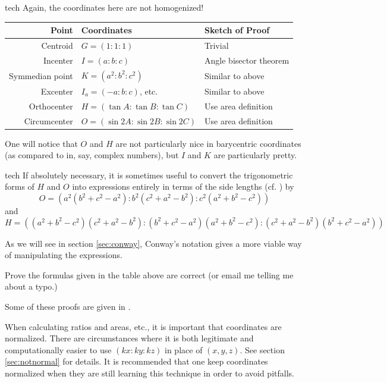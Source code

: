 
\begin{StoreCode}{tech}
Again, the coordinates here are not homogenized!

\begin{tabular}{r|ll}
Point & Coordinates & Sketch of Proof \\ \hline
Centroid & $G = (1:1:1)$ & Trivial \\
Incenter & $I = (a:b:c)$ & Angle bisector theorem \\
Symmedian point & $K=(a^2:b^2:c^2)$ & Similar to above \\
Excenter & $I_a = (-a:b:c)$, etc. & Similar to above \\
Orthocenter & $H=(\tan A : \tan B : \tan C)$ & Use area definition \\
Circumcenter & $O=(\sin 2A : \sin 2B : \sin 2C)$ & Use area definition
\end{tabular}

\end{StoreCode}

One will notice that $O$ and $H$ are not particularly nice in barycentric coordinates (as compared to in, say, complex numbers), but $I$ and $K$ are particularly pretty.

\begin{StoreCode}{tech}
  If absolutely necessary, it is sometimes useful to convert the trigonometric forms of $H$ and $O$ into expressions entirely in terms of the side lengths (cf. \cite{wolfram,yiu}) by \[ O = (a^2(b^2+c^2-a^2) : b^2(c^2+a^2-b^2) : c^2(a^2+b^2-c^2)) \] and \[ H = ((a^2+b^2-c^2)(c^2+a^2-b^2) : (b^2+c^2-a^2)(a^2+b^2-c^2) : (c^2+a^2-b^2)(b^2+c^2-a^2)) \]
\end{StoreCode}
As we will see in section \ref{sec:conway}, Conway's notation gives a more viable way of manipulating the expressions.

\begin{exercise}
  Prove the formulas given in the table above are correct (or email me telling me about a typo.)
\end{exercise}

Some of these proofs are given in \cite{abel}.

When calculating ratios and areas, etc., it is important that coordinates are normalized.  There are circumstances where it is both legitimate and computationally easier to use $(kx:ky:kz)$ in place of $(x,y,z)$.  See section \ref{sec:notnormal} for details.  It is recommended that one keep coordinates normalized when they are still learning this technique in order to avoid pitfalls.
